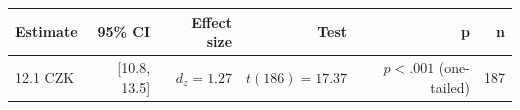 \begin{tabular}{lrrrrr}
\toprule
Estimate & 95\% CI & Effect size & Test & p & n \\
\midrule
12.1 CZK & [10.8, 13.5] & $d_z=1.27$ & $t(186)=17.37$ & $p<.001$ (one-tailed) & 187 \\
\bottomrule
\end{tabular}
